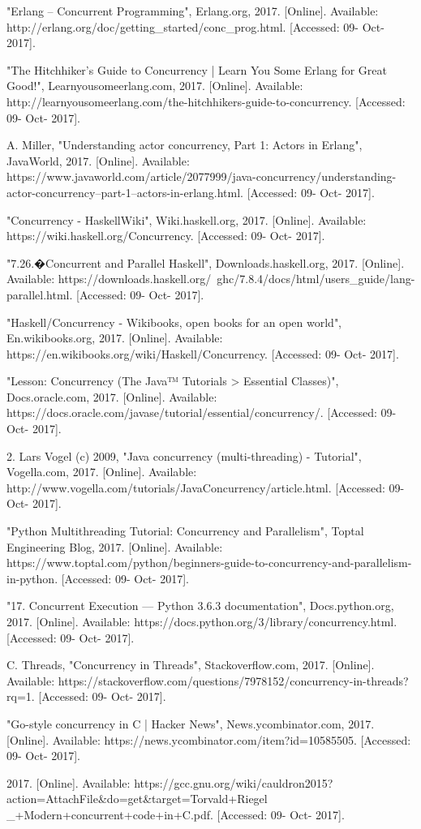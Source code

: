 \documentclass[conference]{IEEEtran}
\begin{document}
\begin{thebibliography}{00}
 "Erlang -- Concurrent Programming", Erlang.org, 2017. [Online]. Available: http://erlang.org/doc/getting\_started/conc\_prog.html. [Accessed: 09- Oct- 2017].

 "The Hitchhiker's Guide to Concurrency | Learn You Some Erlang for Great Good!", Learnyousomeerlang.com, 2017. [Online]. Available: http://learnyousomeerlang.com/the-hitchhikers-guide-to-concurrency. [Accessed: 09- Oct- 2017].

 A. Miller, "Understanding actor concurrency, Part 1: Actors in Erlang", JavaWorld, 2017. [Online]. Available: https://www.javaworld.com/article/2077999/java-concurrency/understanding-actor-concurrency--part-1--actors-in-erlang.html. [Accessed: 09- Oct- 2017].

 "Concurrency - HaskellWiki", Wiki.haskell.org, 2017. [Online]. Available: https://wiki.haskell.org/Concurrency. [Accessed: 09- Oct- 2017].

 "7.26.�Concurrent and Parallel Haskell", Downloads.haskell.org, 2017. [Online]. Available: https://downloads.haskell.org/~ghc/7.8.4/docs/html/users\_guide/lang-parallel.html. [Accessed: 09- Oct- 2017].

 "Haskell/Concurrency - Wikibooks, open books for an open world", En.wikibooks.org, 2017. [Online]. Available: https://en.wikibooks.org/wiki/Haskell/Concurrency. [Accessed: 09- Oct- 2017].

 "Lesson: Concurrency (The Java™ Tutorials > Essential Classes)", Docs.oracle.com, 2017. [Online]. Available: https://docs.oracle.com/javase/tutorial/essential/concurrency/. [Accessed: 09- Oct- 2017].

 2. Lars Vogel (c) 2009, "Java concurrency (multi-threading) - Tutorial", Vogella.com, 2017. [Online]. Available: http://www.vogella.com/tutorials/JavaConcurrency/article.html. [Accessed: 09- Oct- 2017].

 "Python Multithreading Tutorial: Concurrency and Parallelism", Toptal Engineering Blog, 2017. [Online]. Available: https://www.toptal.com/python/beginners-guide-to-concurrency-and-parallelism-in-python. [Accessed: 09- Oct- 2017].

 "17. Concurrent Execution — Python 3.6.3 documentation", Docs.python.org, 2017. [Online]. Available: https://docs.python.org/3/library/concurrency.html. [Accessed: 09- Oct- 2017].

 C. Threads, "Concurrency in Threads", Stackoverflow.com, 2017. [Online]. Available: https://stackoverflow.com/questions/7978152/concurrency-in-threads?rq=1. [Accessed: 09- Oct- 2017].

 "Go-style concurrency in C | Hacker News", News.ycombinator.com, 2017. [Online]. Available: https://news.ycombinator.com/item?id=10585505. [Accessed: 09- Oct- 2017].

 2017. [Online]. Available: https://gcc.gnu.org/wiki/cauldron2015?
action=AttachFile\&do=get\&target=Torvald+Riegel
\_+Modern+concurrent+code+in+C.pdf. [Accessed: 09- Oct- 2017].


\end{thebibliography}
\end{document}
